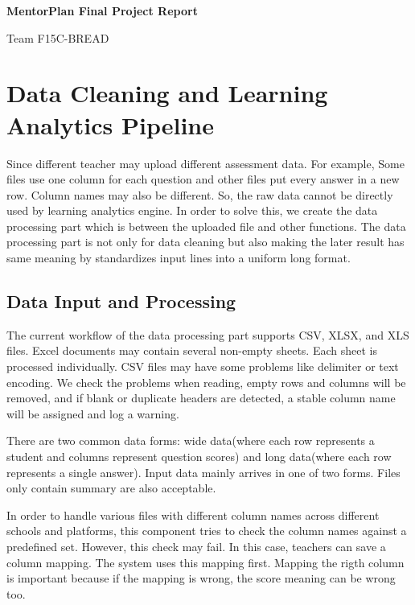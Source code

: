 \documentclass[11pt,a4paper]{article}
\begin{document}
\begin{center}
{\large\bfseries MentorPlan Final Project Report\par}
\vspace{0.1em}
{\small Team F15C-BREAD\par}
\end{center}
\vspace{0.1em}

\section{Data Cleaning and Learning Analytics Pipeline}

Since different teacher may upload different assessment data. For example, Some files use one column for each question and other files put every answer in a new row. Column names may also be different. So, the raw data cannot be directly used by learning analytics engine. In order to solve this, we create the data processing part which is between the uploaded file and other functions. The data processing part is not only for data cleaning but also making the later result has same meaning by standardizes input lines into a uniform long format.

\subsection{Data Input and Processing}

The current workflow of the data processing part supports CSV, XLSX, and XLS files. Excel documents may contain several non-empty sheets. Each sheet is processed individually. CSV files may have some problems like delimiter or text encoding. We check the problems when reading, empty rows and columns will be removed, and if blank or duplicate headers are detected, a stable column name will be assigned and log a warning.

There are two common data forms: wide data(where each row represents a student and columns represent question scores) and long data(where each row represents a single answer). Input data mainly arrives in one of two forms. Files only contain summary are also acceptable.

In order to handle various files with different column names across different schools and platforms, this component tries to check the column names against a predefined set. However, this check may fail. In this case, teachers can save a column mapping. The system uses this mapping first. Mapping the rigth column is important because if the mapping is wrong, the score meaning can be wrong too.
\end{document}
